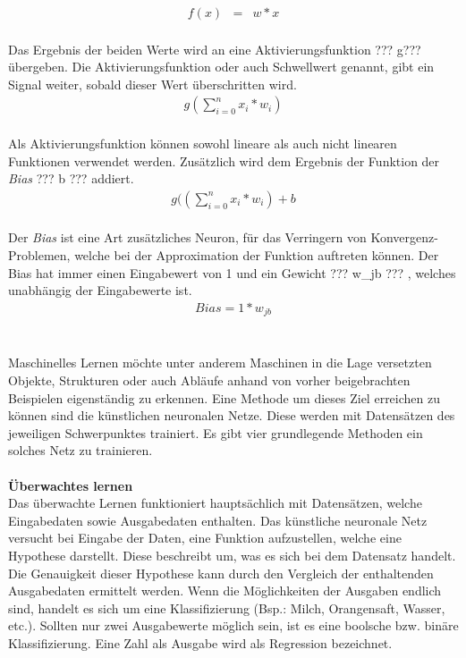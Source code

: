 \documentclass[a4paper,12pt,oneside]{article}
\begin{document}
\begin{eqnarray} f(x) & = & w*x \end{eqnarray}\\
Das Ergebnis der beiden Werte wird an eine Aktivierungsfunktion ??? g??? übergeben. Die Aktivierungsfunktion oder auch Schwellwert genannt, gibt ein Signal weiter, sobald dieser Wert überschritten wird.\\
\begin{eqnarray} g( \sum_{i=0}^n x_{i} *w_{i}) \end{eqnarray}\\
Als Aktivierungsfunktion können sowohl lineare als auch nicht linearen Funktionen verwendet werden. Zusätzlich wird dem Ergebnis der Funktion der \textit{Bias} ??? b ??? addiert.\\
\begin{eqnarray} g(( \sum_{i=0}^n x_{i} *w_{i}) +b \end{eqnarray}\\
Der \textit{Bias} ist eine Art zusätzliches Neuron, für das Verringern von Konvergenz-Problemen, welche bei der Approximation der Funktion auftreten können. Der Bias hat immer einen Eingabewert von 1 und ein Gewicht ??? w_{jb} ??? , welches unabhängig der Eingabewerte ist.\\
\begin{eqnarray} Bias = 1*w_{jb} \end{eqnarray}\\\\
Maschinelles Lernen möchte unter anderem Maschinen in die Lage versetzten Objekte, Strukturen oder auch Abläufe anhand von vorher beigebrachten Beispielen eigenständig zu erkennen. Eine Methode um dieses Ziel erreichen zu können sind die künstlichen neuronalen Netze. Diese werden mit Datensätzen des jeweiligen Schwerpunktes trainiert. Es gibt vier grundlegende Methoden ein solches Netz zu trainieren.\\\\
\textbf{Überwachtes lernen}\\
Das überwachte Lernen funktioniert hauptsächlich mit Datensätzen, welche Eingabedaten sowie Ausgabedaten enthalten. Das künstliche neuronale Netz versucht bei Eingabe der Daten, eine Funktion aufzustellen, welche eine Hypothese darstellt. Diese beschreibt um, was es sich bei dem Datensatz handelt. Die Genauigkeit dieser Hypothese kann durch den Vergleich der enthaltenden Ausgabedaten ermittelt werden. Wenn die Möglichkeiten der Ausgaben endlich sind, handelt es sich um eine Klassifizierung (Bsp.: Milch, Orangensaft, Wasser, etc.). Sollten nur zwei Ausgabewerte möglich sein, ist es eine boolsche bzw. binäre Klassifizierung. Eine Zahl als Ausgabe wird als Regression bezeichnet.\\\\
\end{document}

